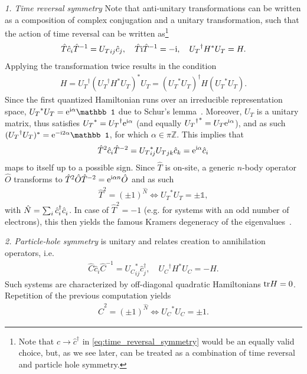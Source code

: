 {\it 1. Time reversal symmetry} Note that anti-unitary transformations can be written as a composition of complex conjugation and a unitary transformation, such that the action of time reversal can be written as\footnote{Note that $\hat c\rightarrow \hat c^\dag$ in \cref{eq:time_reversal_symmetry} would be an equally valid choice, but, as we see later, can be treated as a combination of time reversal and particle hole symmetry.}
\begin{align}
    \hat T \hat c_i \hat T^{-1} = {U_T}_{ij} \hat c_j
    ,\quad
    \hat T\mathrm i\hat T^{-1}=-\mathrm i
    ,\quad
    {U_T}^\dag H^* U_T = H.
    \label{eq:time_reversal_symmetry}
\end{align}
Applying the transformation twice results in the condition
\begin{align}
    H = {U_T}^\dag ({U_T}^\dag H^* U_T)^* U_T = ({U_T}^*U_T)^\dag H ({U_T}^* U_T).
\end{align}
Since the first quantized Hamiltonian runs over an irreducible representation space, ${U_T}^* U_T = \re^{\ri\alpha}\mathbb1$ due to Schur's lemma~\cite{Chiu2016}.
Moreover, $U_T$ is a unitary matrix, thus satisfies ${U_T}^*={U_T}^\dag\mathrm e^{\mathrm i\alpha}$ (and equally ${{U_T}^\dag}^* = U_T\mathrm e^{\mathrm i\alpha}$), and as such $({U_T}^\dag U_T)^* = \re^{-\ri2\alpha}\mathbb1$, for which $\alpha\in\pi\mathds Z$.
This implies that
\begin{align}
    \hat T^2 \hat c_i \hat T^{-2} = {U_T}_{ij}^*{U_T}_{jk} \hat c_k = \mathrm e^{\mathrm i\alpha}\hat c_i
\end{align}
maps to itself up to a possible sign.
Since $\hat T$ is on-site, a generic $n$-body operator $\hat O$ transforms to $\hat T^2\hat O \hat T^{-2} = \mathrm e^{\mathrm i\alpha n}\hat O$ and as such
\begin{align}
    \hat T^2 = (\pm 1)^{\hat N}\Leftrightarrow {U_T}^* {U_T} = \pm\mathbb1,
\end{align}
with $\hat N = \sum_i \hat c^\dag_i \hat c^\pdag_i$.
In case of $\hat T^2=-1$ (e.g. for systems with an odd number of electrons), this then yields the famous Kramers degeneracy of the eigenvalues~\cite{Schwabl2007}.

{\it 2. Particle-hole symmetry} is unitary and relates creation to annihilation operators, i.e.
\begin{align}
    \hat C \hat c_i \hat C^{-1} = {U_C}^*_{ij} \hat c^\dag_j
    ,\quad
    {U_C}^\dag H^* {U_C} = -H
    .
\end{align}
Such systems are characterized by off-diagonal quadratic Hamiltonians ${\rm tr} H=0$.
Repetition of the previous computation yields
\begin{align}
    \hat C^2 = (\pm1)^{\hat N}
    \Leftrightarrow
    {U_C}^* {U_C} = \pm 1.
\end{align}

